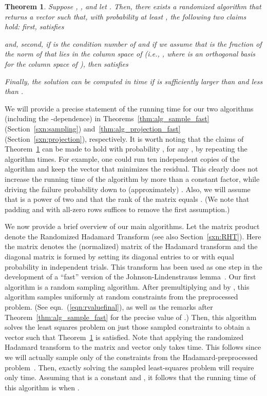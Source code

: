 \documentclass[11pt]{article}
\newtheorem{theorem}{Theorem}
\begin{document}
\begin{theorem}
\label{thm:main_result}
Suppose , , and let . Then, there exists a randomized algorithm that returns a vector  such that, with probability at least , the following two claims hold: first,  satisfies

and, second, if  is the condition number of  and if we assume that  is the fraction of the norm of  that lies in the column space of  (i.e., , where  is an orthogonal basis for the column space of ), then  satisfies

Finally, the solution  can be computed in  time if  is sufficiently larger than  and less than .
\end{theorem}
We will provide a precise statement of the running time for our two algorithms (including the -dependence) in Theorems~\ref{thm:alg_sample_fast} (Section~\ref{sxn:sampling})
and~\ref{thm:alg_projection_fast} (Section~\ref{sxn:projection}), respectively. It is worth noting that the claims of Theorem~\ref{thm:main_result} can be made to hold with probability , for any , by repeating the algorithm  times. For example, one could run ten independent copies of the algorithm and keep the vector  that minimizes the residual. This clearly does not increase the running time of the algorithm by more than a constant factor, while driving the failure probability down to (approximately) . Also, we will assume that  is a power of two and that the rank of the  matrix  equals . (We note that padding  and  with all-zero rows suffices to remove the first assumption.)

We now provide a brief overview of our main algorithms. Let the matrix product  denote the  Randomized Hadamard Transform (see also Section~\ref{sxn:RHT}). Here the  matrix  denotes the (normalized) matrix of the Hadamard transform and the  diagonal matrix  is formed by setting its diagonal entries to  or  with equal probability in   independent trials. This transform has been used as one step in the development of a ``fast'' version of the Johnson-Lindenstrauss lemma~\cite{AC06,Matousek08_RSA}. Our first algorithm is a random sampling algorithm. After premultiplying  and  by , this algorithm samples uniformly at random  constraints from the preprocessed problem. (See eqn.~(\ref{eqn:rvaluefinal}), as well as the remarks after Theorem~\ref{thm:alg_sample_fast} for the precise value of .) Then, this algorithm solves the least squares problem on just those sampled constraints to obtain a vector  such that Theorem~\ref{thm:main_result} is satisfied. Note that applying the randomized Hadamard transform to the matrix  and vector  only takes  time. This follows since we will actually sample only  of the constraints from the Hadamard-preprocessed problem~\cite{AL08}. Then, exactly solving the  sampled least-squares problem will require only  time. Assuming that  is a constant and , it follows that the running time of this algorithm is  when .
\end{document}
